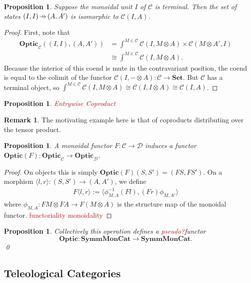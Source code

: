 \documentclass[11pt,a4paper]{article}
\theoremstyle{plain}
\newtheorem{proposition}[theorem]{Proposition}
\theoremstyle{definition}
\newtheorem{remark}[theorem]{Remark}
\newcommand{\C}{\mathscr{C}}
\newcommand{\D}{\mathscr{D}}
\newcommand{\Set}{\mathbf{Set}}
\newcommand{\SymmMonCat}{\mathbf{SymmMonCat}}
\newcommand{\Optic}{\mathbf{Optic}}
\newcommand{\hto}{\ensuremath{\,\mathaccent\shortmid\rightarrow\,}}
\newcommand{\todo}[1]{\textcolor{red}{\small #1}}
\begin{document}
\begin{proposition}
Suppose the monoidal unit $I$ of $\C$ is terminal. Then the set of states $(I, I) \hto (A, A')$ is isomorphic to $\C(I, A)$.
\end{proposition}
\begin{proof}
First, note that
\begin{align*}
\Optic_\C((I,I), (A,A')) 
&= \int^{M \in \C} \C(I, M \otimes A) \times \C(M \otimes A', I) \\
&\cong \int^{M \in \C} \C(I, M \otimes A).
\end{align*}
Because the interior of this coend is mute in the contravariant position, the coend is equal to the colimit of the functor $\C(I, - \otimes A) : \C \to \Set$. But $\C$ has a terminal object, so $\int^{M \in \C} \C(I, M \otimes A) \cong \C(I, I \otimes A) \cong \C(I, A)$.
\end{proof}

\begin{proposition}
\todo{Entrywise Coproduct}
\end{proposition}

\begin{remark}
The motivating example here is that of coproducts distributing over the tensor product.
\end{remark}

\begin{proposition}
\label{prop-change-of-action-monoidal}
A monoidal functor $F : \C \to \D$ induces a functor $\Optic(F) : \Optic_\C \to \Optic_\D$.
\end{proposition}
\begin{proof}
On objects this is simply $\Optic(F)(S, S') = (FS, FS')$. On a morphism $\langle l, r \rangle : (S, S') \to (A, A')$, we define
\begin{align*}
F\langle l, r \rangle := \langle \phi^{-1}_{M,A} (Fl), (Fr) \phi_{M,A'}\rangle
\end{align*}
where $\phi_{M,A} : FM \otimes FA \to F(M \otimes A)$ is the structure map of the monoidal functor.
\todo{functoriality}
\todo{monoidality}
\end{proof}

\begin{proposition}
\label{prop-optic-functor}
Collectively this operation defines a \todo{pseudo?}functor \[\Optic : \SymmMonCat \to \SymmMonCat.\] \qed
\end{proposition}

\subsection{Teleological Categories}
\label{teleological-categories}
\end{document}
